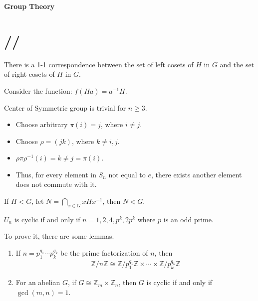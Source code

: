 \newpage
\begin{center}
    {\LARGE \bf Group Theory}
\end{center}

\section{//} \label{sec:}

\begin{question}
    There is a 1-1 correspondence between the set of left cosets of $H$ in $G$ and the set of right cosets of $H$ in $G$.
\end{question}
Consider the function: $f(Ha) = a^{-1}H$.

\begin{question}
    Center of Symmetric group is trivial for $n\ge 3$.
\end{question}
\begin{itemize}
    \item Choose arbitrary $\pi(i) = j$, where $i\neq j$.
    \item Choose $\rho = (j k)$, where $k\neq i,j$.
    \item $\rho \pi \rho^{-1}(i) = k \neq j = \pi(i)$.
    \item Thus, for every element in $S_n$ not equal to $e$, there exists another element does not commute with it.
\end{itemize}

\begin{question}
    If $H < G$, let $N = \bigcap_{x \in G} xHx^{-1}$, then $N \triangleleft G$. 
\end{question}

\begin{question}
    $U_n$ is cyclic if and only if $n=1,2,4,p^{k},2p^{k}$ where $p$ is an odd prime.
\end{question}
To prove it, there are some lemmas.
\begin{remark}
\begin{enumerate}
    \item If $n=p_1^{q_1}\cdots p_k^{q_k}$ be the prime factorization of $n$, then
    \begin{align*}
        \mathbb{Z}/n\mathbb{Z} \cong \mathbb{Z}/p_1^{q_1}\mathbb{Z} \times \cdots \times \mathbb{Z}/p_k^{q_k}\mathbb{Z}
    \end{align*}
    \item For an abelian $G$, if $G \cong \mathbb{Z}_m \times \mathbb{Z}_n$, then $G$ is cyclic if and only if $\operatorname{gcd}(m,n)=1$.
\end{enumerate}
\end{remark}

